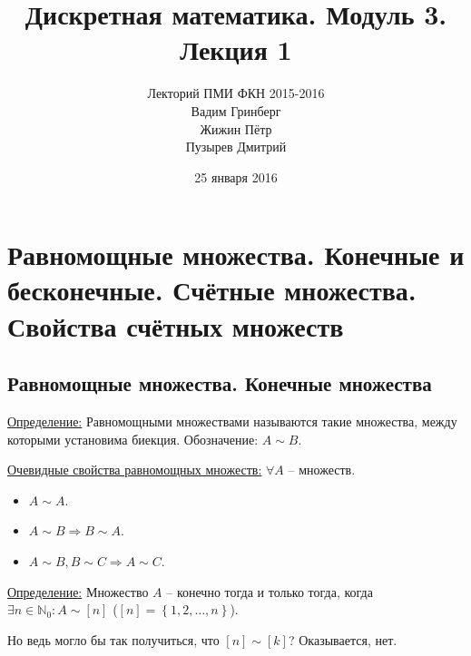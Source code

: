 \documentclass[a4paper, 12pt]{article}
\newcommand{\definition}{\underline{Определение:} }
\newcommand{\N}{\mathbb{N}}
\begin{document}
\title{Дискретная математика. Модуль 3. Лекция 1}
\author{Лекторий ПМИ ФКН 2015-2016\\Вадим Гринберг\\Жижин Пётр\\Пузырев Дмитрий}
\date{25 января 2016}

\maketitle
\section{Равномощные множества. Конечные и бесконечные. Счётные множества. Свойства счётных множеств}
\subsection*{Равномощные множества. Конечные множества}
\definition Равномощными множествами называются такие множества,
между которыми установима биекция. Обозначение: $A \sim B$.

\underline{Очевидные свойства равномощных множеств:} $\forall A$ -- множеств.
\begin{itemize}
        \item $A \sim A$.
        \item $A \sim B \Rightarrow B \sim A$.
        \item $A \sim B, B \sim C \Rightarrow A \sim C$.
\end{itemize}

\definition Множество $A$ -- конечно тогда и только тогда,
когда $\exists n \in \N_0: A \sim [n]$ ($[n] = \left\{ 1, 2, \ldots, n \right\}$).

Но ведь могло бы так получиться, что $[n] \sim [k]$? Оказывается, нет.
\end{document}
